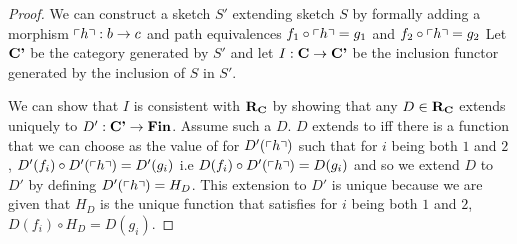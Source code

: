 \begin{proof}
We can construct a sketch $S'$ extending sketch $S$ 
 by formally adding a morphism $\left\ulcorner h\right\urcorner: b \rightarrow c$
and path equivalences $f_1 \circ \left\ulcorner h\right\urcorner = g_1$ and $f_2 \circ \left\ulcorner h\right\urcorner = g_2$
Let $\textbf{C'}$ be the category generated by $S'$ and
let $I: \textbf{C} \rightarrow \textbf{C'}$ be the inclusion functor generated 
by the inclusion of $S$ in $S'$. 

We can show that $I$ is consistent with $\textbf{R}_{\textbf{C}}$
by showing that any $D \in \textbf{R}_{\textbf{C}}$
extends uniquely to $D' :\textbf{C'} \rightarrow \textbf{Fin}$. Assume such a $D$. 
$D$  extends to \catcpw iff there is a  function that 
we can choose as the value of  for $D'(\left\ulcorner h\right\urcorner)$  
such that for $i$ being both $1$ and $2$,  $D'(f_i) \circ D'(\left\ulcorner h\right\urcorner) = D'(g_i)$ 
i.e  $D(f_i) \circ D'(\left\ulcorner h\right\urcorner) = D(g_i)$ and so we  extend $D$ to $D'$ 
 by defining $D'(\left\ulcorner h\right\urcorner)=H_D$.
This extension to $D'$ is unique because we are given that
$H_D$ is the unique function that satisfies 
for $i$ being both $1$ and $2$, $D(f_i) \circ H_D = D(g_i)$.


\end{proof}
